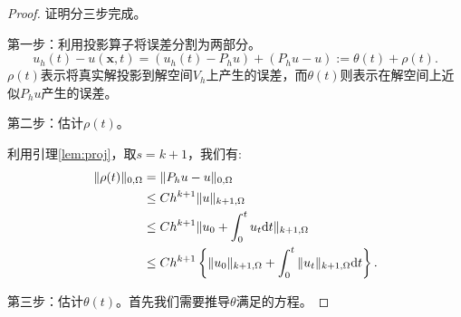 \begin{proof}
    证明分三步完成。

    第一步：利用投影算子将误差分割为两部分。
    \begin{equation}
        u_{h}(t)-u(\mathbf{x},t)=(u_{h}(t)-P_{h}u)+(P_{h}u-u):=\theta(t)+\rho(t).
    \end{equation}
    $\rho(t)$表示将真实解投影到解空间$V_{h}$上产生的误差，而$\theta(t)$则表示在解空间上近似$P_{h}u$产生的误差。

    第二步：估计$\rho(t)$。

    利用引理\ref{lem:proj}，取$s=k+1$，我们有:
    \begin{equation}
        \begin{aligned}
            \|\rho(t)\|_{0,\Omega}&=\|P_{h}u-u\|_{0,\Omega}\\
            &\le Ch^{k+1}\|u\|_{k+1,\Omega}\\
            &\le Ch^{k+1}\|u_{0}+\int_{0}^{t}u_{t}\mathrm{d} t\|_{k+1,\Omega}\\
            &\le Ch^{k+1}\left\{
                \|u_{0}\|_{k+1,\Omega}+\int_{0}^{t}\|u_{t}\|_{k+1,\Omega}\mathrm{d} t
            \right\}.
        \end{aligned}
    \end{equation}

    第三步：估计$\theta(t)$。首先我们需要推导$\theta$满足的方程。 


\end{proof}
